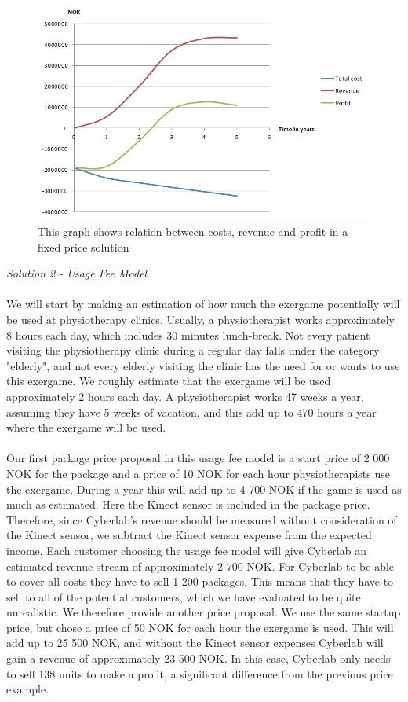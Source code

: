 \begin{figure}
\begin{center}
\includegraphics[scale=0.8]{profitfixed}
\caption[Profit, Revenue and Cost for a Fixed Price Solution]{This graph shows relation between costs, revenue and profit in a fixed price solution}
\label{fig:ProfitFixed}
\end{center}
\end{figure}
\emph{Solution 2 - Usage Fee Model}\\ \\
We will start by making an estimation of how much the exergame potentially will be used at physiotherapy clinics. Usually, a physiotherapist works approximately 8 hours each day, which includes 30 minutes lunch-break. Not every patient visiting the physiotherapy clinic during a regular day falls under the category "elderly", and not every elderly visiting the clinic has the need for or wants to use this exergame. We roughly estimate that the exergame will be used approximately 2 hours each day. A physiotherapist works 47 weeks a year, assuming they have 5 weeks of vacation, and this add up to 470 hours a year where the exergame will be used.\\ \\
Our first package price proposal in this usage fee model is a start price of 2 000 NOK for the package and a price of 10 NOK for each hour physiotherapists use the exergame. During a year this will add up to 4 700 NOK if the game is used as much as estimated. Here the Kinect sensor is included in the package price. Therefore, since Cyberlab’s revenue should be measured without consideration of the Kinect sensor, we subtract the Kinect sensor expense from the expected income. Each customer choosing the usage fee model will give Cyberlab an estimated revenue stream of approximately 2 700 NOK. For Cyberlab to be able to cover all costs they have to sell 1 200 packages. This means that they have to sell to all of the potential customers, which we have evaluated to be quite unrealistic. We therefore provide another price proposal. We use the same startup price, but chose a price of 50 NOK for each hour the exergame is used. This will add up to 25 500 NOK, and without the Kinect sensor expenses Cyberlab will gain a revenue of approximately 23 500 NOK. In this case, Cyberlab only needs to sell 138 units to make a profit, a significant difference from the previous price example. \\ \\
